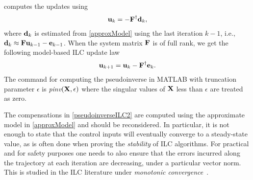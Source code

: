 computes the updates using %
% 
%
\begin{equation}
\begin{aligned}
\boldsymbol{\mathrm{u}}_{k} = -\boldsymbol{\mathrm{F}}^{\dagger}\boldsymbol{\mathrm{d}}_{k},
\end{aligned}
\label{pseudoinverseILC1}
\end{equation}
%
\noindent where $\boldsymbol{\mathrm{d}}_{k}$ is estimated from \eqref{approxModel} using the last iteration $k-1$, i.e., $\boldsymbol{\mathrm{d}}_{k} \approx \boldsymbol{\mathrm{F}} \boldsymbol{\mathrm{u}}_{k-1} - \boldsymbol{\mathrm{e}}_{k-1}$. When the system matrix $\boldsymbol{\mathrm{F}}$ is of full rank, we get the following model-based ILC update law 
%
\begin{equation}
\begin{aligned}
\boldsymbol{\mathrm{u}}_{k+1} = \boldsymbol{\mathrm{u}}_{k} - \boldsymbol{\mathrm{F}}^{\dagger}\boldsymbol{\mathrm{e}}_{k}.
\end{aligned}
\label{pseudoinverseILC2}
\end{equation}
%
\noindent The command for computing the pseudoinverse in MATLAB with truncation parameter $\epsilon$ is \emph{pinv}$(\boldsymbol{\mathrm{X}},\epsilon)$ where the singular values of $\boldsymbol{\mathrm{X}}$ less than $\epsilon$ are treated as zero. 

The compensations in \eqref{pseudoinverseILC2} are computed using the approximate model in \eqref{approxModel} and should be reconsidered. In particular, it is not enough to state that the control inputs will eventually converge to a steady-state value, as is often done when proving the \emph{stability} of ILC algorithms. For practical and for safety purposes one needs to also ensure that the errors incurred along the trajectory at each iteration are decreasing, under a particular vector norm. This is studied in the ILC literature under \emph{monotonic convergence}~\cite{Bristow06}. 

